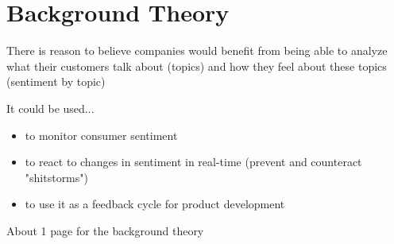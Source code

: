 
\chapter{Background Theory}

\label{ch:backgroundTheory}

There is reason to believe companies would benefit from being able to analyze what their customers talk about (topics) and how they feel about these topics (sentiment by topic)

It could be used...
\begin{itemize}
    \item
    to monitor consumer sentiment
    \item
    to react to changes in sentiment in real-time (prevent and counteract "shitstorms")
    \item
    to use it as a feedback cycle for product development
\end{itemize}

About 1 page for the background theory

\pagebreak[1]